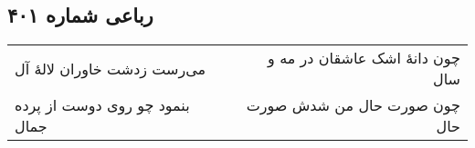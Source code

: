 \begin{center}
\section*{رباعی شماره ۴۰۱}
\label{sec:sh401}
\begin{longtable}{l p{0.5cm} r}
می‌رست زدشت خاوران لالهٔ آل
&&
چون دانهٔ اشک عاشقان در مه و سال
\\
بنمود چو روی دوست از پرده جمال
&&
چون صورت حال من شدش صورت حال
\\
\end{longtable}
\end{center}
